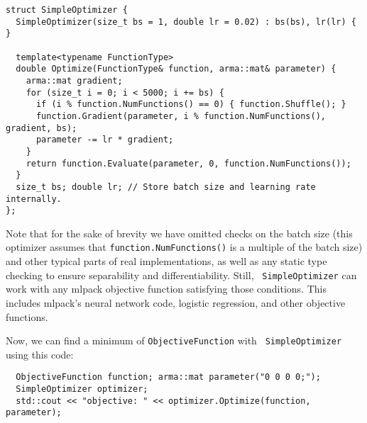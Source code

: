 \documentclass{article}
\begin{document}
\vspace{-0.3em}
\begin{verbatim}
struct SimpleOptimizer {
  SimpleOptimizer(size_t bs = 1, double lr = 0.02) : bs(bs), lr(lr) { }

  template<typename FunctionType>
  double Optimize(FunctionType& function, arma::mat& parameter) {
    arma::mat gradient;
    for (size_t i = 0; i < 5000; i += bs) {
      if (i % function.NumFunctions() == 0) { function.Shuffle(); }
      function.Gradient(parameter, i % function.NumFunctions(), gradient, bs);
      parameter -= lr * gradient;
    }
    return function.Evaluate(parameter, 0, function.NumFunctions());
  }
  size_t bs; double lr; // Store batch size and learning rate internally.
};
\end{verbatim}
\vspace{-0.3em}

Note that for the sake of brevity we have omitted checks on the batch size
(this optimizer assumes that {\tt function.NumFunctions()} is a multiple of the
batch size) and other typical parts of real implementations, as well as any
static type checking to ensure separability and differentiability.  Still, {\tt
SimpleOptimizer} can work with any mlpack objective function satisfying those
conditions.  This includes mlpack's neural network code, logistic regression,
and other objective functions.

Now, we can find a minimum of {\tt ObjectiveFunction} with {\tt
SimpleOptimizer} using this code:

\vspace*{-0.4em}
\begin{verbatim}
  ObjectiveFunction function; arma::mat parameter("0 0 0 0;");
  SimpleOptimizer optimizer;
  std::cout << "objective: " << optimizer.Optimize(function, parameter);
\end{verbatim}
\vspace*{-0.4em}
\end{document}
